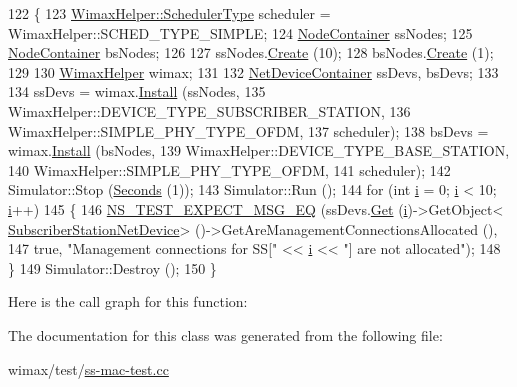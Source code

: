 \begin{DoxyCode}
122 \{
123   \hyperlink{classns3_1_1WimaxHelper_a27a40a8f601900126156781c2ca79406}{WimaxHelper::SchedulerType} scheduler = WimaxHelper::SCHED\_TYPE\_SIMPLE;
124   \hyperlink{classns3_1_1NodeContainer}{NodeContainer} ssNodes;
125   \hyperlink{classns3_1_1NodeContainer}{NodeContainer} bsNodes;
126 
127   ssNodes.\hyperlink{classns3_1_1NodeContainer_a787f059e2813e8b951cc6914d11dfe69}{Create} (10);
128   bsNodes.\hyperlink{classns3_1_1NodeContainer_a787f059e2813e8b951cc6914d11dfe69}{Create} (1);
129 
130   \hyperlink{classns3_1_1WimaxHelper}{WimaxHelper} wimax;
131 
132   \hyperlink{classns3_1_1NetDeviceContainer}{NetDeviceContainer} ssDevs, bsDevs;
133 
134   ssDevs = wimax.\hyperlink{classns3_1_1WimaxHelper_a9f0848e09c4b6db9cdde9872b38f6349}{Install} (ssNodes,
135                           WimaxHelper::DEVICE\_TYPE\_SUBSCRIBER\_STATION,
136                           WimaxHelper::SIMPLE\_PHY\_TYPE\_OFDM,
137                           scheduler);
138   bsDevs = wimax.\hyperlink{classns3_1_1WimaxHelper_a9f0848e09c4b6db9cdde9872b38f6349}{Install} (bsNodes,
139                           WimaxHelper::DEVICE\_TYPE\_BASE\_STATION,
140                           WimaxHelper::SIMPLE\_PHY\_TYPE\_OFDM,
141                           scheduler);
142   Simulator::Stop (\hyperlink{group__timecivil_ga33c34b816f8ff6628e33d5c8e9713b9e}{Seconds} (1));
143   Simulator::Run ();
144   \textcolor{keywordflow}{for} (\textcolor{keywordtype}{int} \hyperlink{bernuolliDistribution_8m_a6f6ccfcf58b31cb6412107d9d5281426}{i} = 0; \hyperlink{bernuolliDistribution_8m_a6f6ccfcf58b31cb6412107d9d5281426}{i} < 10; \hyperlink{bernuolliDistribution_8m_a6f6ccfcf58b31cb6412107d9d5281426}{i}++)
145     \{
146       \hyperlink{group__testing_ga7304ba46a28d8cf08dfdfd6499cf7068}{NS\_TEST\_EXPECT\_MSG\_EQ} (ssDevs.\hyperlink{classns3_1_1NetDeviceContainer_a677d62594b5c9d2dea155cc5045f4d0b}{Get} (\hyperlink{bernuolliDistribution_8m_a6f6ccfcf58b31cb6412107d9d5281426}{i})->GetObject<
      \hyperlink{classns3_1_1SubscriberStationNetDevice}{SubscriberStationNetDevice}> ()->GetAreManagementConnectionsAllocated (),
147                              \textcolor{keyword}{true}, \textcolor{stringliteral}{"Management connections for SS["} << \hyperlink{bernuolliDistribution_8m_a6f6ccfcf58b31cb6412107d9d5281426}{i} << \textcolor{stringliteral}{"] are not allocated"});
148     \}
149   Simulator::Destroy ();
150 \}
\end{DoxyCode}


Here is the call graph for this function\+:




The documentation for this class was generated from the following file\+:\begin{DoxyCompactItemize}
\item 
wimax/test/\hyperlink{ss-mac-test_8cc}{ss-\/mac-\/test.\+cc}\end{DoxyCompactItemize}
